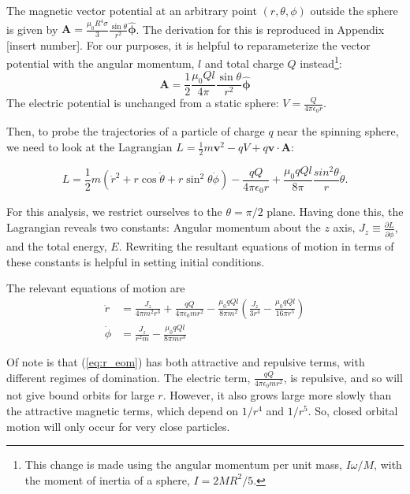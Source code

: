 \documentclass[11pt]{article}
\begin{document}
 The magnetic vector potential at an arbitrary point $(r,\theta,\phi)$ outside the sphere is given by $\mathbf{A} = \frac{\mu_0R^4\sigma}{3}\frac{\sin\theta}{r^2}\mathbf{\hat{\phi}}$.  The derivation for this is reproduced in Appendix [insert number].  For our purposes, it is helpful to reparameterize the vector potential with the angular momentum, $l$ and total charge $Q$ instead\footnote{This change is made using the angular momentum per unit mass, $I\omega/M$, with the moment of inertia of a sphere, $I = 2MR^2/5$.}:
 \begin{equation}
 \mathbf{A} = \frac{1}{2}\frac{\mu_0 Q l}{4\pi}\frac{\sin\theta}{r^2}\mathbf{\hat{\phi}}
 \end{equation}
The electric potential is unchanged from a static sphere: $V = \frac{Q}{4\pi\epsilon_0r}$.


Then, to probe the trajectories of a particle of charge $q$ near the spinning sphere, we need to look at the Lagrangian $L = \frac{1}{2}m\mathbf{v}^2 - qV + q\mathbf{v}\cdot\mathbf{A}$:

\begin{equation}\label{eq:particle_lagr}
L = \frac{1}{2}m\left(\dot{r}^2 + r\cos\dot{\theta} + r\sin^2\theta\dot{\phi}\right) - \frac{qQ}{4\pi\epsilon_0r} + \frac{\mu_0qQl}{8\pi}\frac{sin^2\theta}{r}\dot{\theta}.
\end{equation}
 
For this analysis, we restrict ourselves to the $\theta = \pi/2$ plane.  Having done this, the Lagrangian reveals two constants:  Angular momentum about the $z$ axis, $J_z \equiv \frac{\partial L}{\partial \dot{\phi}}$, and the total energy, $E$.  Rewriting the resultant equations of motion in terms of these constants is helpful in setting initial conditions.

The relevant equations of motion are
\begin{align}
\ddot{r} &= \frac{J_z}{4\pi m^2 r^3} + \frac{qQ}{4\pi\epsilon_0 m r^2} - \frac{\mu_0 q Q l}{8 \pi m^2}\left(\frac{J_z}{3r^4} - \frac{\mu_0 q Q l}{16\pi r^5}\right)\label{eq:r_eom}\\
\dot{\phi} &= \frac{J_z}{r^2m} - \frac{\mu_0qQl}{8\pi m r^3}\label{eq:ph_eom}
\end{align}

Of note is that (\ref{eq:r_eom}) has both attractive and repulsive terms, with different regimes of domination.  The electric term, $\frac{qQ}{4\pi\epsilon_0 m r^2}$, is repulsive, and so will not give bound orbits for large $r$.  However, it also grows large more slowly than the attractive magnetic terms, which depend on $1/r^4$ and $1/r^5$.  So, closed orbital motion will only occur for very close particles.
\end{document}
